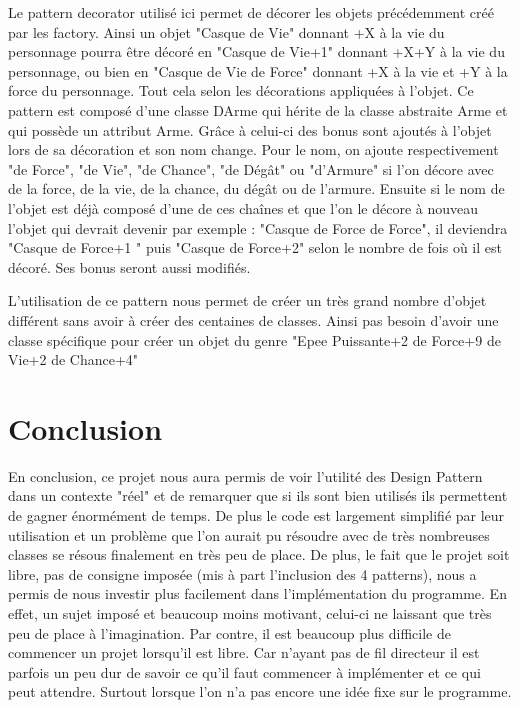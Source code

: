 \documentclass[a4paper]{article}
\begin{document}
Le pattern decorator utilisé ici permet de décorer les objets précédemment créé par les factory.
Ainsi un objet "Casque de Vie" donnant +X à la vie du personnage pourra être décoré en "Casque de Vie+1" donnant +X+Y à la vie du personnage, ou bien en "Casque de Vie de Force" donnant +X à la vie et +Y à la force du personnage.
Tout cela selon les décorations appliquées à l'objet.
Ce pattern est composé d'une classe DArme qui hérite de la classe abstraite Arme et qui possède un attribut Arme.
Grâce à celui-ci des bonus sont ajoutés à l'objet lors de sa décoration et son nom change.
Pour le nom, on ajoute respectivement "de Force", "de Vie", "de Chance", "de Dégât" ou "d'Armure" si l'on décore avec de la force, de la vie, de la chance, du dégât ou de l'armure.
Ensuite si le nom de l'objet est déjà composé d'une de ces chaînes et que l'on le décore à nouveau l'objet qui devrait devenir par exemple :
"Casque de Force de Force", il deviendra "Casque de Force+1 " puis "Casque de Force+2" selon le nombre de fois où il est décoré.
Ses bonus seront aussi modifiés.

L'utilisation de ce pattern nous permet de créer un très grand nombre d'objet différent sans avoir à créer des centaines de classes. Ainsi pas besoin d'avoir une classe spécifique pour créer un objet du genre "Epee Puissante+2 de Force+9 de Vie+2 de Chance+4"

  \newpage
  \section{Conclusion}

En conclusion, ce projet nous aura permis de voir l'utilité des Design Pattern dans un contexte "réel" et de remarquer que si ils sont bien utilisés ils permettent de gagner énormément de temps. De plus le code est largement simplifié par leur utilisation et un problème que l'on aurait pu résoudre avec de très nombreuses classes se résous finalement en très peu de place.
De plus, le fait que le projet soit libre, pas de consigne imposée (mis à part l’inclusion des 4 patterns), nous a permis de nous investir plus facilement dans l'implémentation du programme.
En effet, un sujet imposé et beaucoup moins motivant, celui-ci ne laissant que très peu de place à l'imagination.
Par contre, il est beaucoup plus difficile de commencer un projet lorsqu'il est libre. Car n'ayant pas de fil directeur il est parfois un peu dur de savoir ce qu'il faut commencer à implémenter et ce qui peut attendre. Surtout lorsque l’on n’a pas encore une idée fixe sur le programme.
\end{document}
